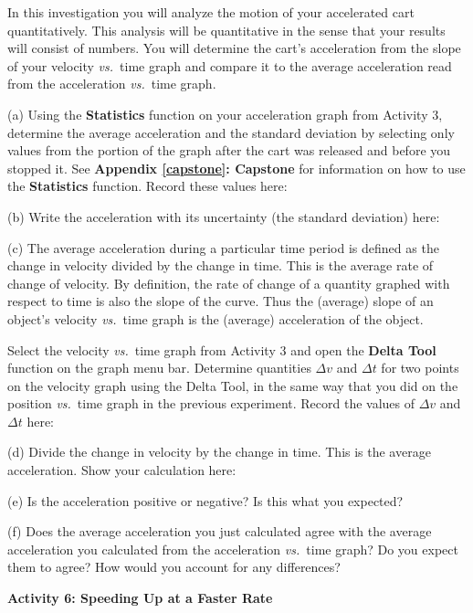 In this investigation you will analyze the motion of your accelerated cart quantitatively.
This analysis will be quantitative in the sense that your results will consist
of numbers. You will determine the cart's acceleration from the slope of your
velocity \textit{vs.}~time graph and compare it to the average acceleration read from
the acceleration \textit{vs.}~time graph. 

(a) Using the \textbf{Statistics} function on your acceleration graph from Activity 3, determine the average acceleration and the standard deviation by selecting only values from the portion of the graph after the cart was released and before you stopped it. See \textbf{Appendix \ref{capstone}: Capstone} for information on how to use the \textbf{Statistics} function. Record these values here:
\answerspace{20mm}

(b) Write the acceleration with its uncertainty (the standard deviation) here:
\answerspace{20mm}

(c) The average acceleration during a particular time period is defined as the
change in velocity divided by the change in time. This is the average rate of
change of velocity. By definition, the rate of change of a quantity graphed
with respect to time is also the slope of the curve. Thus the (average) slope
of an object's velocity \textit{vs.}~time graph is the (average) acceleration of the
object.

Select the velocity \textit{vs.}~time graph from Activity 3 and open the \textbf{Delta Tool} function on the graph menu bar. Determine quantities \( \Delta v\) and \( \Delta t\) for two points on the velocity graph using the Delta Tool, in the same way that you did on the position \textit{vs.}~time graph in the previous experiment. Record the values of 
\( \Delta v\) and \( \Delta t\) here:
\answerspace{20mm}

(d) Divide the change in velocity by the change in time. This is the average acceleration. Show your calculation here:
\answerspace{20mm}

\pagebreak[2]
(e) Is the acceleration positive or negative? Is this what you expected? 
\answerspace{15mm}

(f) Does the average acceleration you just calculated agree with the average
acceleration you calculated from the acceleration \textit{vs.}~time graph? Do you expect them to agree? How would you account for any differences? 
\answerspace{20mm}

\textbf{Activity 6: Speeding Up at a Faster Rate} 

